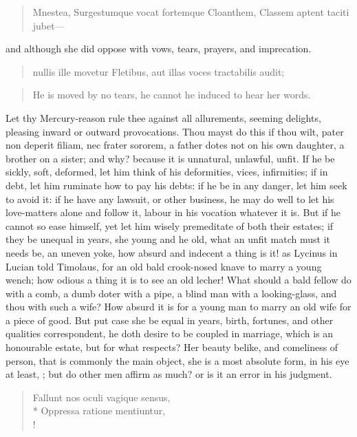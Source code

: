 \begin{latin}
\begin{verse}
Mnestea, Surgestumque vocat fortemque Cloanthem,
Classem aptent taciti jubet---
\end{verse}
\end{latin}

and although she did oppose with vows, tears, prayers, and imprecation.

\begin{latin}
\begin{verse}
nullis ille movetur
Fletibus, aut illas voces tractabilis audit;
\end{verse}
\end{latin}
\translationrule%
\begin{verse}%
He is moved by no tears,
he cannot he induced to hear her words.
\end{verse}%

Let thy Mercury-reason rule thee against all allurements, seeming
delights, pleasing inward or outward provocations. Thou mayst do this
if thou wilt, pater non deperit filiam, nec frater sororem, a father
dotes not on his own daughter, a brother on a sister; and why? because
it is unnatural, unlawful, unfit. If he be sickly, soft, deformed, let
him think of his deformities, vices, infirmities; if in debt, let him
ruminate how to pay his debts: if he be in any danger, let him seek to
avoid it: if he have any lawsuit, or other business, he may do well to
let his love-matters alone and follow it, labour in his vocation
whatever it is. But if he cannot so ease himself, yet let him wisely
premeditate of both their estates; if they be unequal in years, she
young and he old, what an unfit match must it needs be, an uneven yoke,
how absurd and indecent a thing is it! as Lycinus in Lucian told
Timolaus, for an old bald crook-nosed knave to marry a young wench; how
odious a thing it is to see an old lecher! What should a bald fellow do
with a comb, a dumb doter with a pipe, a blind man with a
looking-glass, and thou with such a wife? How absurd it is for a young
man to marry an old wife for a piece of good. But put case she be equal
in years, birth, fortunes, and other qualities correspondent, he doth
desire to be coupled in marriage, which is an honourable estate, but
for what respects? Her beauty belike, and comeliness of person, that is
commonly the main object, she is a most absolute form, in his eye at
least, ; but do other
men affirm as much? or is it an error in his judgment.
%
\begin{latin}
\begin{verse}%
Fallunt nos oculi vagique sensus,\\*
Oppressa ratione mentiuntur,\\!
\end{verse}%
\end{latin}
%

